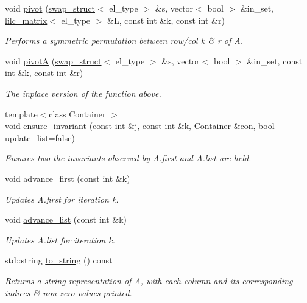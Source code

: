 \begin{DoxyCompactItemize}
void \hyperlink{classlilc__matrix_a0bb81dfe0808df725cf91f0d7639dcd0}{pivot} (\hyperlink{classswap__struct}{swap\+\_\+struct}$<$ el\+\_\+type $>$ \&s, vector$<$ bool $>$ \&in\+\_\+set, \hyperlink{classlilc__matrix}{lilc\+\_\+matrix}$<$ el\+\_\+type $>$ \&L, const int \&k, const int \&r)
\begin{DoxyCompactList}\small\item\em Performs a symmetric permutation between row/col k \& r of A. \end{DoxyCompactList}\item 
void \hyperlink{classlilc__matrix_aaecb203a3a6ebc85bf0c3a603e6b0fa2}{pivotA} (\hyperlink{classswap__struct}{swap\+\_\+struct}$<$ el\+\_\+type $>$ \&s, vector$<$ bool $>$ \&in\+\_\+set, const int \&k, const int \&r)
\begin{DoxyCompactList}\small\item\em The inplace version of the function above. \end{DoxyCompactList}\item 
{\footnotesize template$<$class Container $>$ }\\void \hyperlink{classlilc__matrix_aa1d3045545357a8f33955a87dc55f3aa}{ensure\+\_\+invariant} (const int \&j, const int \&k, Container \&con, bool update\+\_\+list=false)
\begin{DoxyCompactList}\small\item\em Ensures two the invariants observed by A.\+first and A.\+list are held. \end{DoxyCompactList}\item 
void \hyperlink{classlilc__matrix_a177dde39764c88fe4e82b050a5e60303}{advance\+\_\+first} (const int \&k)
\begin{DoxyCompactList}\small\item\em Updates A.\+first for iteration k. \end{DoxyCompactList}\item 
void \hyperlink{classlilc__matrix_ab9ee09328b84657630f52631ea8e5eb1}{advance\+\_\+list} (const int \&k)
\begin{DoxyCompactList}\small\item\em Updates A.\+list for iteration k. \end{DoxyCompactList}\item 
std\+::string \hyperlink{classlilc__matrix_a60c5a4a0ec9a49d43be087b6d67f4df2}{to\+\_\+string} () const 
\begin{DoxyCompactList}\small\item\em Returns a string representation of A, with each column and its corresponding indices \& non-\/zero values printed. \end{DoxyCompactList}\item 

\end{DoxyCompactItemize}
